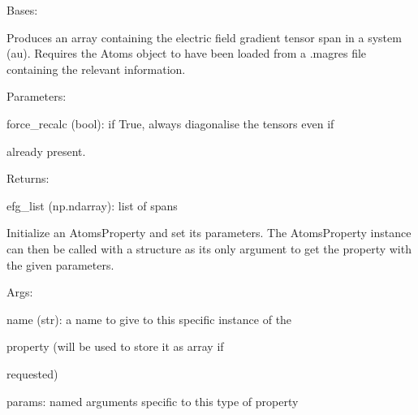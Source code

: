 \documentclass[letterpaper,10pt,english]{sphinxmanual}
\begin{document}
\begin{fulllineitems}
\label{doctree/soprano.properties.nmr.efg:soprano.properties.nmr.efg.EFGSpan}
Bases: {\hyperref[doctree/soprano.properties.atomsproperty:soprano.properties.atomsproperty.AtomsProperty]{}}

Produces an array containing the electric field gradient tensor span
in a system (au).
Requires the Atoms object to have been loaded from a .magres file
containing the relevant information.

\begin{DUlineblock}{0em}
\item[] Parameters:
\item[]
\begin{DUlineblock}{\DUlineblockindent}
\item[] force\_recalc (bool): if True, always diagonalise the tensors even if
\item[]
\begin{DUlineblock}{\DUlineblockindent}
\item[] already present.
\end{DUlineblock}
\end{DUlineblock}
\end{DUlineblock}

\begin{DUlineblock}{0em}
\item[] Returns:
\item[]
\begin{DUlineblock}{\DUlineblockindent}
\item[] efg\_list (np.ndarray): list of spans
\end{DUlineblock}
\end{DUlineblock}

Initialize an AtomsProperty and set its parameters.
The AtomsProperty instance can then be called with a structure as its
only argument to get the property with the given parameters.

\begin{DUlineblock}{0em}
\item[] Args:
\item[]
\begin{DUlineblock}{\DUlineblockindent}
\item[] name (str): a name to give to this specific instance of the
\item[]
\begin{DUlineblock}{\DUlineblockindent}
\item[] property (will be used to store it as array if
\item[] requested)
\end{DUlineblock}
\item[] params: named arguments specific to this type of property
\end{DUlineblock}
\end{DUlineblock}


\end{fulllineitems}
\end{document}
